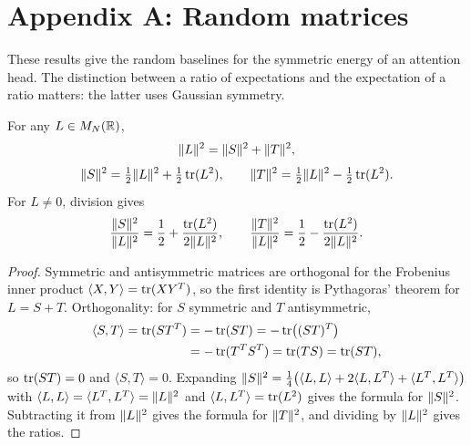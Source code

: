 \chapter{Appendix A: Random matrices}

These results give the random baselines for the symmetric energy of an
attention head. The distinction between a ratio of expectations and
the expectation of a ratio matters: the latter uses Gaussian symmetry.

\begin{lemma}
\label{lem:energy}
\leanok
{}
For any $L\in M_N(\mathbb{R})$,
\[
 \lVert L\rVert^2=\lVert S\rVert^2+\lVert T\rVert^2,
\]
\[
 \lVert S\rVert^2=\tfrac12\lVert L\rVert^2+\tfrac12\operatorname{tr}(L^2),\qquad
 \lVert T\rVert^2=\tfrac12\lVert L\rVert^2-\tfrac12\operatorname{tr}(L^2).
\]
For $L\ne0$, division gives
\[
 \frac{\lVert S\rVert^2}{\lVert L\rVert^2}=\frac12+\frac{\operatorname{tr}(L^2)}{2\lVert L\rVert^2},
 \qquad
 \frac{\lVert T\rVert^2}{\lVert L\rVert^2}=\frac12-\frac{\operatorname{tr}(L^2)}{2\lVert L\rVert^2}.
\]
\end{lemma}
\begin{proof}
\leanok
{}
Symmetric and antisymmetric matrices are orthogonal for the Frobenius
inner product $\langle X,Y\rangle=\operatorname{tr}(XY^T)$, so the first identity is
Pythagoras' theorem for $L=S+T$. Orthogonality: for $S$ symmetric and $T$
antisymmetric,
\[
 \begin{aligned}
 \langle S,T\rangle=\operatorname{tr}(ST^T)&=-\operatorname{tr}(ST)=-\operatorname{tr}\bigl((ST)^T\bigr)\\
 &=-\operatorname{tr}(T^TS^T)=\operatorname{tr}(TS)=\operatorname{tr}(ST),
 \end{aligned}
\]
so $\operatorname{tr}(ST)=0$ and $\langle S,T\rangle=0$. Expanding
$\lVert S\rVert^2=\tfrac14\bigl(\langle L,L\rangle+2\langle L,L^T\rangle+\langle L^T,L^T\rangle\bigr)$
with $\langle L,L\rangle=\langle L^T,L^T\rangle=\lVert L\rVert^2$ and
$\langle L,L^T\rangle=\operatorname{tr}(L^2)$ gives the formula for $\lVert S\rVert^2$.
Subtracting it from $\lVert L\rVert^2$ gives the formula for $\lVert T\rVert^2$, and
dividing by $\lVert L\rVert^2$ gives the ratios.
\end{proof}

